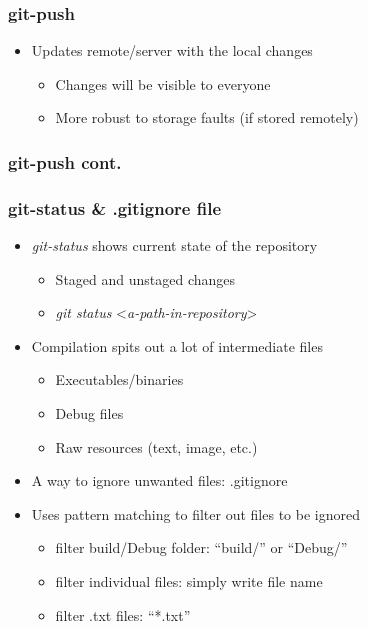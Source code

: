 \documentclass{beamer}
\begin{document}
\begin{frame}
  \frametitle{git-push}
  \begin{itemize}
  \item<1-> Updates remote/server with the local changes
    \begin{itemize}
    \item<2-> Changes will be visible to everyone
    \item<3-> More robust to storage faults (if stored remotely)
    \end{itemize}
  \end{itemize}
\end{frame}

\begin{frame}
  \frametitle{git-push cont.}
  {\centering
  }
\end{frame}

\begin{frame}
  \frametitle{git-status \& .gitignore file}
  \begin{itemize}
  \item<1-> \textit{git-status} shows current state of the repository
    \begin{itemize}
    \item<2-> Staged and unstaged changes
    \item<2-> \textit{git status} {\textless}\textit{a-path-in-repository}{\textgreater}
    \end{itemize}
  \item<3-> Compilation spits out a lot of intermediate files
    \begin{itemize}
    \item<4-> Executables/binaries
    \item<4-> Debug files
    \item<4-> Raw resources (text, image, etc.)
    \end{itemize}
  \item<5-> A way to ignore unwanted files: .gitignore
  \item<6-> Uses pattern matching to filter out files to be ignored
    \begin{itemize}
    \item<7-> filter build/Debug folder: ``build/'' or ``Debug/''
    \item<8-> filter individual files: simply write file name
    \item<9-> filter .txt files: ``*.txt''
    \end{itemize}
  \end{itemize}
\end{frame}
\end{document}
